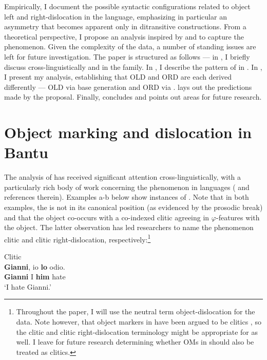 \documentclass[output=paper,newtxmath,modfonts,nonflat,hidelinks]{langsci/langscibook}
\begin{document}
Empirically, I document the possible syntactic configurations related to object left and right-dislocation in the language, emphasizing in particular an asymmetry that becomes apparent only in ditransitive constructions. From a theoretical perspective, I propose an analysis inspired by \citet{Cecchetto1999} and \citet{Zeller2015} to capture the phenomenon. Given the complexity of the data, a number of standing issues are left for future investigation. The paper is structured as follows — in , I briefly discuss  cross-linguistically and in the  family. In , I describe the pattern of  in . In , I present my analysis, establishing that OLD and ORD are each derived differently — OLD via base generation and ORD via .  lays out the predictions made by the proposal. Finally,  concludes and points out areas for future research.

\section{Object marking and dislocation in Bantu}\label{sec:ranero:2}
\largerpage[2]
The analysis of  has received significant attention \newline cross-linguistically, with a particularly rich body of work concerning the phenomenon in  languages (\citealt{anagnostopouloutoappear} and references therein). Examples a-b below show instances of . Note that in both examples, the  is not in its canonical position (as evidenced by the prosodic break) and that the object co-occurs with a co-indexed clitic agreeing in $\varphi $-features with the object. The latter observation has led researchers to name the phenomenon clitic  and clitic right-dislocation, respectively:\footnote{Throughout the paper, I will use the neutral term object-dislocation for the  data. Note however, that object markers in  have been argued to be clitics \citep{diercks2015}, so the clitic  and clitic right-dislocation terminology might be appropriate for  as well. I leave for future research determining whether OMs in  should also be treated as clitics.}

\ea\label{ex:ranero:2}
 \citep{Cecchetto1999}
\ea\label{ex:ranero:2a} Clitic \\
\gll \textbf{Gianni}, io \textbf{lo}    odio. \\ 
\textbf{Gianni} I   \textbf{him} hate      \\
\glt ‘I hate Gianni.’ 
\end{document}
